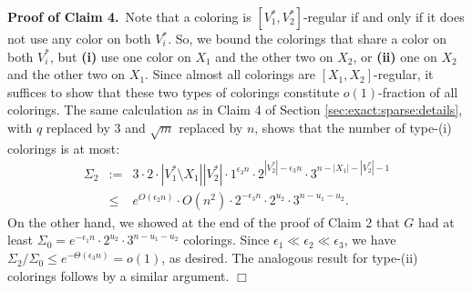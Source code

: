 \documentclass[11pt]{article}
\begin{document}
\noindent \textbf{Proof of Claim 4.}\, Note that a coloring is
$[V_1^*, V_2^*]$-regular if and only if it does not use any color on
both $V_i^*$.  So, we bound the colorings that share a color on both
$V_i^*$, but \textbf{(i)} use one color on $X_1$ and the other two on
$X_2$, or \textbf{(ii)} one on $X_2$ and the other two on $X_1$.
Since almost all colorings are $[X_1, X_2]$-regular, it suffices to
show that these two types of colorings constitute $o(1)$-fraction of
all colorings.  The same calculation as in Claim 4 of Section
\ref{sec:exact:sparse:details}, with $q$ replaced by 3 and $\sqrt{m}$
replaced by $n$, shows that the number of type-(i) colorings is at
most:
%
\begin{eqnarray*}
  \Sigma_2 &:=& 3 \cdot 2 \cdot |V_1^* \setminus X_1| |V_2^*| \cdot
  1^{\epsilon_3 n} \cdot 2^{|V_2^*| - \epsilon_3 n} \cdot
  3^{n-|X_1|-|V_2^*|-1} \\
  &\leq& e^{O(\epsilon_2 n)} \cdot O(n^2) \cdot 2^{-\epsilon_3 n} \cdot 2^{u_2} \cdot 3^{n-u_1-u_2}.
\end{eqnarray*}
On the other hand, we showed at the end of the proof of Claim 2 that
$G$ had at least $\Sigma_0 = e^{-\epsilon_1 n} \cdot 2^{u_2} \cdot
3^{n-u_1-u_2}$ colorings.  Since $\epsilon_1 \ll \epsilon_2 \ll
\epsilon_3$, we have $\Sigma_2 / \Sigma_0 \leq e^{-\Theta(\epsilon_3
  n)} = o(1)$, as desired.  The analogous result for type-(ii)
colorings follows by a similar argument.  \hfill $\Box$



\vspace{3mm}
\end{document}
